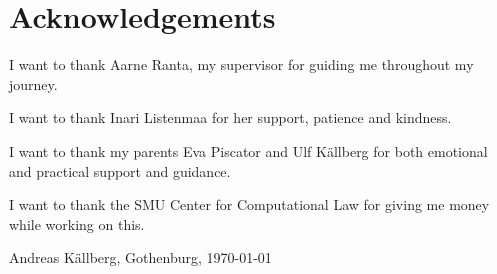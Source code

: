\thispagestyle{plain}			%
\section*{Acknowledgements}

I want to thank Aarne Ranta, my supervisor for guiding me throughout my journey.

I want to thank Inari Listenmaa for her support, patience and kindness.

I want to thank my parents Eva Piscator and Ulf Källberg for both emotional and practical support and guidance.

I want to thank the SMU Center for Computational Law for giving me money while working on this.


\vspace{1.5cm}
\hfill
Andreas Källberg, Gothenburg, \today

\newpage				%
\thispagestyle{empty}
\mbox{}
